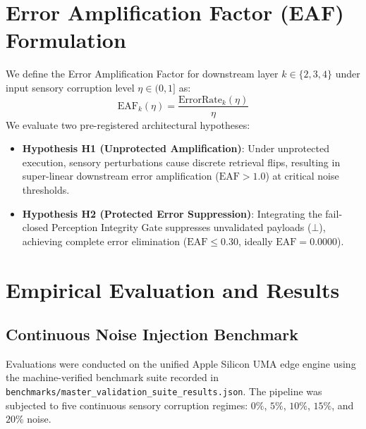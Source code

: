 \documentclass[10pt,journal,compsoc]{IEEEtran}
\begin{document}
\section{Error Amplification Factor (EAF) Formulation}
We define the Error Amplification Factor for downstream layer $k \in \{2, 3, 4\}$ under input sensory corruption level $\eta \in (0, 1]$ as:
\begin{equation}
\text{EAF}_k(\eta) = \frac{\text{ErrorRate}_k(\eta)}{\eta}
\end{equation}
We evaluate two pre-registered architectural hypotheses:
\begin{itemize}
    \item \textbf{Hypothesis H1 (Unprotected Amplification)}: Under unprotected execution, sensory perturbations cause discrete retrieval flips, resulting in super-linear downstream error amplification ($\text{EAF} > 1.0$) at critical noise thresholds.
    \item \textbf{Hypothesis H2 (Protected Error Suppression)}: Integrating the fail-closed Perception Integrity Gate suppresses unvalidated payloads ($\bot$), achieving complete error elimination ($\text{EAF} \le 0.30$, ideally $\text{EAF} = 0.0000$).
\end{itemize}

\section{Empirical Evaluation and Results}

\subsection{Continuous Noise Injection Benchmark}
Evaluations were conducted on the unified Apple Silicon UMA edge engine using the machine-verified benchmark suite recorded in \texttt{benchmarks/master\_validation\_suite\_results.json}. The pipeline was subjected to five continuous sensory corruption regimes: $0\%$, $5\%$, $10\%$, $15\%$, and $20\%$ noise.
\end{document}
